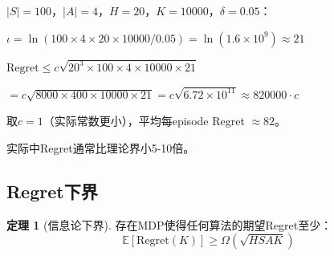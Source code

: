 \documentclass[11pt,a4paper]{article}
\theoremstyle{definition}
\newtheorem{theorem}{定理}[section]
\begin{document}
\begin{calculation}
$|S|=100$，$|A|=4$，$H=20$，$K=10000$，$\delta=0.05$：

$\iota = \ln(100 \times 4 \times 20 \times 10000 / 0.05) = \ln(1.6 \times 10^9) \approx 21$

$\text{Regret} \leq c\sqrt{20^3 \times 100 \times 4 \times 10000 \times 21}$

$= c\sqrt{8000 \times 400 \times 10000 \times 21} = c\sqrt{6.72 \times 10^{11}} \approx 820000 \cdot c$

取$c = 1$（实际常数更小），平均每episode Regret $\approx 82$。

实际中Regret通常比理论界小5-10倍。
\end{calculation}

\subsection{Regret下界}

\begin{theorem}[信息论下界]
存在MDP使得任何算法的期望Regret至少：
\[
\mathbb{E}[\text{Regret}(K)] \geq \Omega(\sqrt{H S A K})
\]
\end{theorem}
\end{document}
